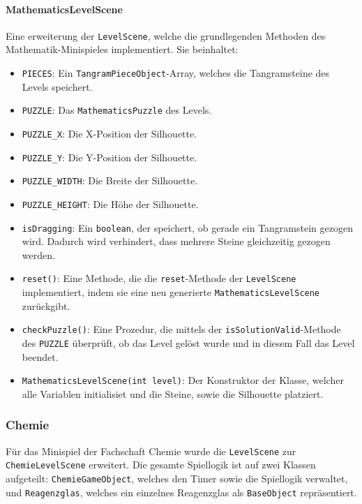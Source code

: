 \paragraph{MathematicsLevelScene} Eine erweiterung der \texttt{LevelScene}, welche die grundlegenden Methoden des Mathematik-Minispieles implementiert.
Sie beinhaltet:

\begin{sloppypar}
    \begin{itemize}
        \item \texttt{PIECES}: Ein \texttt{TangramPieceObject}-Array, welches die Tangramsteine des Levels speichert.
        \item \texttt{PUZZLE}: Das \texttt{MathematicsPuzzle} des Levels.
        \item \texttt{PUZZLE\_X}: Die X-Position der Silhouette.
        \item \texttt{PUZZLE\_Y}: Die Y-Position der Silhouette.
        \item \texttt{PUZZLE\_WIDTH}: Die Breite der Silhouette.
        \item \texttt{PUZZLE\_HEIGHT}: Die Höhe der Silhouette.
        \item \texttt{isDragging}: Ein \texttt{boolean}, der speichert, ob gerade ein Tangramstein gezogen wird.
            Dadurch wird verhindert, dass mehrere Steine gleichzeitig gezogen werden.
        \item \texttt{reset()}: Eine Methode, die die \texttt{reset}-Methode der \texttt{LevelScene} implementiert, indem sie eine neu generierte \texttt{MathematicsLevelScene} zurückgibt.
        \item \texttt{checkPuzzle()}: Eine Prozedur, die mittels der \texttt{isSolutionValid}-Methode des \texttt{PUZZLE} überprüft, ob das Level gelöst wurde und in diesem Fall das Level beendet.
        \item \texttt{MathematicsLevelScene(int level)}: Der Konstruktor der Klasse, welcher alle Variablen initialisiet und die Steine, sowie die Silhouette platziert.
    \end{itemize}
\end{sloppypar}

\subsubsection{Chemie}

\begin{sloppypar}
    Für das Minispiel der Fachschaft Chemie wurde die \texttt{LevelScene} zur \texttt{ChemieLevelScene} erweitert.
    Die gesamte Spiellogik ist auf zwei Klassen aufgeteilt: \texttt{ChemieGameObject}, welches den Timer sowie die Spiellogik verwaltet, und \texttt{Reagenzglas}, welches ein einzelnes Reagenzglas als \texttt{BaseObject} repräsentiert.
\end{sloppypar}

